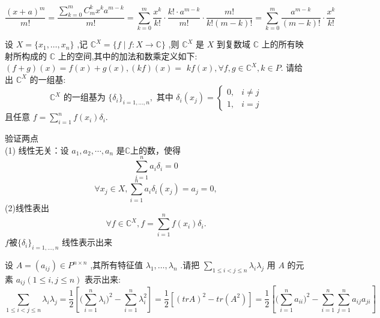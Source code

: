 \documentclass[lang=cn,12pt]{elegantbook}
\begin{document}
\begin{solution}
    \[
    \frac{(x+a)^m}{m!} = \frac{\sum_{k =0}^{m} C_m^k x^k a^{m-k}}{m!} = \sum_{k=0}^m \frac{x^k}{k!} \cdot \frac{k!\cdot a^{m-k}}{m!} \cdot \frac{m!}{k!(m-k)!}=\sum_{k=0}^m \frac{a^{m-k}}{(m-k)!} \cdot \frac{x^k}{k!}
    \]
\end{solution}

\begin{example}
    设 \(X = \{x_{1},\ldots ,x_{n}\}\) ,记 \(\mathbb{C}^{X} = \{f\mid f:X\to \mathbb{C}\}\) ,则 \(\mathbb{C}^{X}\) 是 \(X\) 到复数域 \(\mathbb{C}\) 上的所有映射所构成的 \(\mathbb{C}\) 上的空间,其中的加法和数乘定义如下: \((f + g)(x) = f(x) + g(x),(kf)(x) =\) \(kf(x),\forall f,g\in \mathbb{C}^{X},k\in P.\) 请给出 \(\mathbb{C}^{X}\) 的一组基:
    \[
    \mathbb{C}^X \text{ 的一组基为 } \{\delta_i\}_{i=1,\dots,n},\text{ 其中 }
    \delta_i(x_j)=\begin{cases}
    0, & i\neq j\\
    1, & i=j
    \end{cases}
    \]
    且任意 \(f = \sum_{i=1}^n f(x_i)\delta_i\).
\end{example}

\begin{solution}
    验证两点 \\
    (1) 线性无关：设 \(a_1, a_2, \cdots, a_n\) 是\(\mathbb{C} \)上的数，使得
    \[
    \sum _{i =1}^n a_i \delta_i = 0
    \]
    \[
    \forall x_j \in X, \sum_{i=1}^n a_i \delta_i(x_j) = a_j = 0,
    \]
    (2)线性表出
    \[
    \forall f \in \mathbb{C}^X, f = \sum_{i=1}^n f(x_i)\delta_i.
    \]
    $f$被\(\{\delta_i\}_{i=1,\dots,n}\) 线性表示出来
\end{solution}

\begin{example}
    设 \(A = (a_{ij})\in P^{n\times n}\) ,其所有特征值 \(\lambda_{1},\ldots ,\lambda_{n}\) .请把 \(\sum_{1\leq i< j\leq n}\lambda_{i}\lambda_{j}\) 用 \(A\) 的元素 \(a_{ij}(1\leq i,j\leq n)\) 表示出来:
    \[
    \sum_{1\leq i<j\leq n}\lambda_i\lambda_j = \frac{1}{2}\left[\bigl(\sum_{i=1}^n\lambda_i\bigr)^2 - \sum_{i=1}^n\lambda_i^2\right]
    = \frac{1}{2}\left[(tr A)^2 - tr (A^2)\right]
    = \frac{1}{2}\left[\bigl(\sum_{i=1}^n a_{ii}\bigr)^2 - \sum_{i=1}^n\sum_{j=1}^n a_{ij}a_{ji}\right]
    \]
\end{example}
\end{document}
